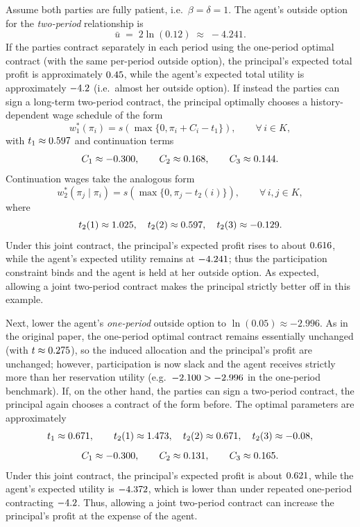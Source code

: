 \documentclass[12pt]{article}
\theoremstyle{definition}
\begin{document}
Assume both parties are fully patient, i.e.\ \(\beta=\delta=1\). The agent’s outside option for the \emph{two-period} relationship is
\[
\bar u \;=\; 2\ln(0.12)\;\approx\;-4.241 .
\]
If the parties contract separately in each period using the one-period optimal contract (with the same per-period outside option), 
the principal’s expected total profit is approximately \(\fpeval{round(2*\Pibaselineoneperiod, 5)}\), while the agent’s expected 
total utility is approximately \(\fpeval{round(2*\Ubaselineoneperiod, 5)}\) (i.e.\ almost her outside option). If instead the parties can sign a 
long-term two-period contract, the principal optimally chooses a history-dependent wage schedule of the form
\[
w_1^*(\pi_i)=s\!\left(\max\{0,\pi_i+C_i-t_1\}\right),\qquad \forall\, i\in K,
\]
with \(t_1\approx 0.597\) and continuation terms
\[
C_1 \approx -0.300,\qquad C_2 \approx 0.168,\qquad C_3 \approx 0.144.
\]
Continuation wages take the analogous form
\[
w_2^*(\pi_j\mid \pi_i)=s\!\left(\max\{0,\pi_j-t_2(i)\}\right),\qquad \forall\, i,j\in K,
\]
where
\[
t_2(1)\approx 1.025,\quad t_2(2)\approx 0.597,\quad t_2(3)\approx -0.129.
\]
Under this joint contract, the principal’s expected profit rises to about \(0.616\), while the agent’s expected utility remains at \(-4.241\); 
thus the participation constraint binds and the agent is held at her outside option. As expected, allowing a joint two-period contract makes the principal strictly better off in this example.

Next, lower the agent’s \emph{one-period} outside option to \(\ln(0.05)\approx -2.996\). As in the original paper, the one-period optimal 
contract remains essentially unchanged (with \(t\approx 0.275\)), so the induced allocation and the principal’s profit are unchanged; 
however, participation is now slack and the agent receives strictly more than her reservation utility (e.g.\ \(-2.100 > -2.996\) 
in the one-period benchmark). If, on the other hand, the parties can sign a two-period contract, the principal again chooses a contract of the form before. The optimal parameters are approximately
\[
t_1 \approx 0.671,\qquad
t_2(1)\approx 1.473,\quad
t_2(2)\approx 0.671,\quad
t_2(3)\approx -0.08,
\]
\[
C_1 \approx -0.300,\qquad
C_2 \approx 0.131,\qquad
C_3 \approx 0.165.
\]
Under this joint contract, the principal’s expected profit is about \(0.621\), while the agent’s expected utility is \(-4.372\), 
which is lower than under repeated one-period contracting \(\fpeval{round(2*\Uoneperiodlowoutsideoption, 3)}\). Thus, allowing a joint two-period contract can increase the principal’s profit at the expense of the agent.
\end{document}
